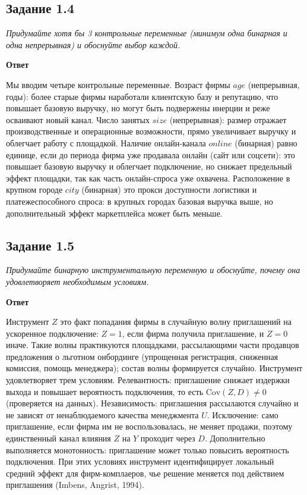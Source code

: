 \documentclass[12pt,a4paper]{article}
\newcommand{\zadanie}[2]{\subsection*{Задание #1}\begingroup\itshape #2\par\endgroup\medskip}
\newcommand{\otvet}{\par\noindent\textbf{Ответ}\par\medskip}
\begin{document}
\zadanie{1.4}{Придумайте хотя бы 3 контрольные переменные (минимум одна бинарная и одна непрерывная) и обоснуйте выбор каждой.}
\otvet
Мы вводим четыре контрольные переменные. Возраст фирмы $\textit{age}$ (непрерывная, годы): более старые фирмы наработали клиентскую базу и репутацию, что повышает базовую выручку, но могут быть подвержены инерции и реже осваивают новый канал. Число занятых $\textit{size}$ (непрерывная): размер отражает производственные и операционные возможности, прямо увеличивает выручку и облегчает работу с площадкой. Наличие онлайн-канала $\textit{online}$ (бинарная) равно единице, если до периода фирма уже продавала онлайн (сайт или соцсети): это повышает базовую выручку и облегчает подключение, но снижает предельный эффект площадки, так как часть онлайн-спроса уже охвачена. Расположение в крупном городе $\textit{city}$ (бинарная) это прокси доступности логистики и платежеспособного спроса: в крупных городах базовая выручка выше, но дополнительный эффект маркетплейса может быть меньше.

\zadanie{1.5}{Придумайте бинарную инструментальную переменную и обоснуйте, почему она удовлетворяет необходимым условиям.}
\otvet
Инструмент $Z$ это факт попадания фирмы в случайную волну приглашений на ускоренное подключение: $Z=1$, если фирма получила приглашение, и $Z=0$ иначе. Такие волны практикуются площадками, рассылающими части продавцов предложения о льготном онбординге (упрощенная регистрация, сниженная комиссия, помощь менеджера); состав волны формируется случайно. Инструмент удовлетворяет трем условиям. Релевантность: приглашение снижает издержки выхода и повышает вероятность подключения, то есть $\mathrm{Cov}(Z,D)\neq 0$ (проверяется на данных). Независимость: приглашения рассылаются случайно и не зависят от ненаблюдаемого качества менеджмента $U$. Исключение: само приглашение, если фирма им не воспользовалась, не меняет продажи, поэтому единственный канал влияния $Z$ на $Y$ проходит через $D$. Дополнительно выполняется монотонность: приглашение может только повысить вероятность подключения. При этих условиях инструмент идентифицирует локальный средний эффект для фирм-комплаеров, чье решение меняется под действием приглашения (Imbens, Angrist, 1994).
\end{document}
